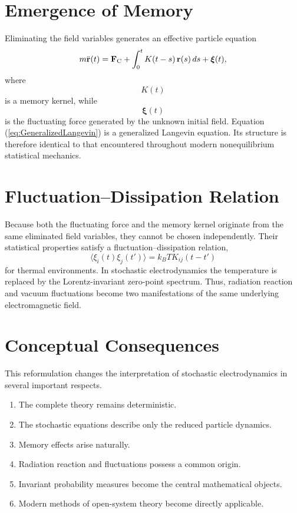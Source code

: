 \section{Emergence of Memory}
Eliminating the field variables generates an effective particle equation
\begin{equation}
m\ddot{\bf r}(t)={\bf F}_{\rm C}+\int_0^tK(t-s)\,{\bf r}(s)\,ds+{\boldsymbol\xi}(t),
\label{eq:GeneralizedLangevin}
\end{equation}
where
\[K(t)\]
is a memory kernel,
while
\[{\boldsymbol\xi}(t)\]
is the fluctuating force generated by the unknown initial field.
Equation
(\ref{eq:GeneralizedLangevin})
is a generalized Langevin equation.
Its structure is therefore identical to that encountered throughout
modern nonequilibrium statistical mechanics.
\section{Fluctuation--Dissipation Relation}
Because both the fluctuating force and the memory kernel originate from
the same eliminated field variables, they cannot be chosen
independently.
Their statistical properties satisfy a fluctuation--dissipation
relation,
\begin{equation}
\langle\xi_i(t)\xi_j(t')\rangle=k_BT K_{ij}(t-t')
\end{equation}
for thermal environments.
In stochastic electrodynamics the temperature is replaced by the
Lorentz-invariant zero-point spectrum.
Thus,
radiation reaction and vacuum fluctuations become two manifestations of
the same underlying electromagnetic field.
\section{Conceptual Consequences}
This reformulation changes the interpretation of stochastic
electrodynamics in several important respects.
\begin{enumerate}
\item
The complete theory remains deterministic.
\item
The stochastic equations describe only the reduced particle dynamics.
\item
Memory effects arise naturally.
\item
Radiation reaction and fluctuations possess a common origin.
\item
Invariant probability measures become the central mathematical objects.
\item
Modern methods of open-system theory become directly applicable.
\end{enumerate}
